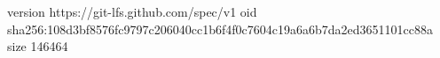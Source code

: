 version https://git-lfs.github.com/spec/v1
oid sha256:108d3bf8576fc9797c206040cc1b6f4f0c7604c19a6a6b7da2ed3651101cc88a
size 146464
